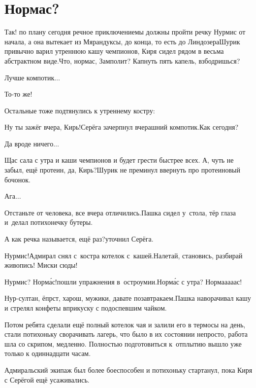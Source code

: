 \chapter{Нормас?}
\vepsianrose

\diagdash Так! по плану сегодня речное приключение\mdash мы должны пройти речку Нурмис от начала, а она вытекает из Мярандуксы, до конца, то есть до Линдозера\mdash Шурик привычно варил утреннюю кашу чемпионов, Киря сидел рядом в весьма абстрактном виде.\mdash Что, нормас, Замполит? Капнуть пять капель, взбодришься?

\diagdash Лучше компотик$\ldots$

\diagdash То-то же!

Остальные тоже подтянулись к утреннему костру:

\diagdash Ну ты зажёг вчера, Кирь!\mdash Серёга зачерпнул вчерашний компотик.\mdash Как сегодня?

\diagdash Да вроде ничего$\ldots$

\diagdash Щас сала с утра и каши чемпионов и будет грести быстрее всех. А, чуть не забыл, ещё протеин, да, Кирь?\mdash Шурик не преминул ввернуть про протеиновый бочонок.

\diagdash Ага$\ldots$

\diagdash Отстаньте от человека, все вчера отличились.\mdash Пашка сидел у~стола, тёр глаза и~делал потихонечку бутеры.

\diagdash А как речка называется, ещё раз?\mdash уточнил Серёга.

\diagdash Нурмис!\mdash Адмирал снял с~костра котелок с~кашей.\mdash Налетай, становись, разбирай живопись! Миски сюды!

\diagdash Нурмис? Норм{\'а}с!\mdash пошли упражнения в~остроумии.\mdash Норм{\'а}с с утра?  Норма\sdash а\sdash а\sdash а\sdash ас!

\diagdash Нур-султан, ёпрст, харош, мужики, давате позавтракаем.\mdash Пашка наворачивал кашу и стрелял конфеты вприкуску с подоспевшим чайком.

Потом ребята сделали ещё полный котелок чая и залили его в термосы на день, стали потихоньку сворачивать лагерь, что было в их состоянии непросто, работа шла со скрипом, медленно. Полностью подготовиться к~отплытию вышло уже только к одиннадцати часам.

Адмиральский экипаж был более боеспособен и потихоньку стартанул, пока Киря с Серёгой ещё усаживались. 


